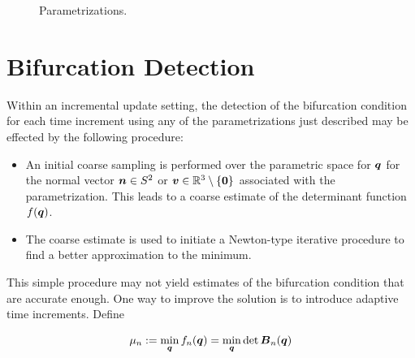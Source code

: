 \documentclass[12pt]{article}
\numberwithin{equation}{section}
\begin{document}
\begin{figure}[htbp]
\begin{center}
{      \label{fig:tangent}
    }
    \caption{Parametrizations.}
    \label{fig:parametrizations}
  \end{center}
\end{figure}

\section{Bifurcation Detection}
\label{sec:detection}

Within an incremental update setting, the detection of the bifurcation
condition for each time increment using any of the parametrizations
just described may be effected by the following procedure:

\begin{itemize}
  
\item An initial coarse sampling is performed over the parametric
  space for ${\boldsymbol{q}}$ for the normal vector ${\boldsymbol{n}} \in S^2$ or ${\boldsymbol{v}} \in
  \mathbb{R}^3 \setminus \{\mathbf{0}\}$ associated with the
  parametrization. This leads to a coarse estimate of the determinant
  function $f({\boldsymbol{q}})$.
  
\item The coarse estimate is used to initiate a Newton-type iterative
  procedure to find a better approximation to the minimum.


\end{itemize}

This simple procedure may not yield estimates of the bifurcation
condition that are accurate enough. One way to improve the solution is
to introduce adaptive time increments. Define

\begin{equation} \label{eq:general-minimization-problem}
  \mu_n := \min_{{\boldsymbol{q}}} f_n({\boldsymbol{q}}) = \min_{{\boldsymbol{q}}} \det {\boldsymbol{B}}_n({\boldsymbol{q}})
\end{equation}
\end{document}
